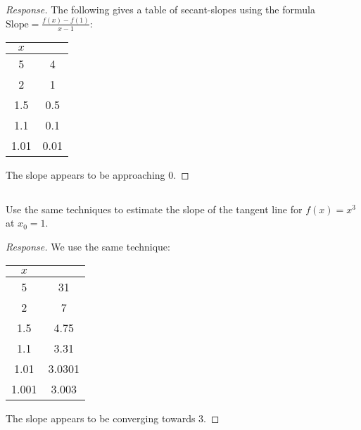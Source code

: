 \documentclass[english]{article}
\newcommand{\prt}[1]{\setcounter{subsection}{#1-1}\subsection{}}
\theoremstyle{remark}
\theoremstyle{definition}
\begin{document}
\begin{proof}[Response]
	The following gives a table of secant-slopes using the formula $\text{Slope}=\frac{f(x)-f(1)}{x-1}$:
	\begin{table}[h!]\begin{tabular}{c|c}
			$x$&\text{Slope}\\\hline
		5 & 4 \\
		2 & 1 \\
		1.5 & 0.5 \\
		1.1 & 0.1 \\
		1.01 & 0.01 \\\end{tabular}\end{table}

The slope appears to be approaching 0.\end{proof}
	\vspace{4cm}
\prt{2} Use the same techniques to estimate the slope of the tangent line for $f(x)=x^3$ at $x_0=1$.
\begin{proof}[Response]
	We use the same technique:\begin{table}[h!]\begin{tabular}{c|c}
			$x$&\text{Slope}\\\hline
		5 & 31 \\
		2 & 7 \\
		1.5 & 4.75 \\
		1.1 & 3.31 \\
		1.01 & 3.0301 \\
		1.001 & 3.003 \\\end{tabular}\end{table}
	
	The slope appears to be converging towards 3.

\end{proof}
\end{document}

